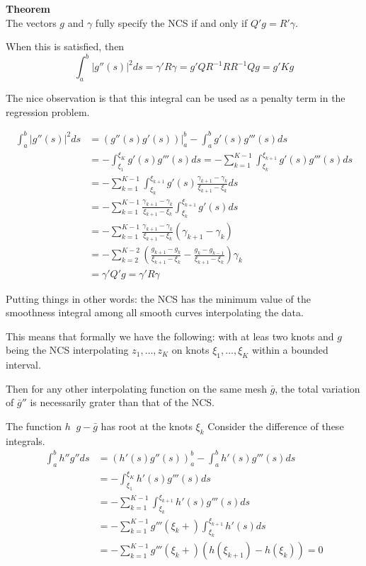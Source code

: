 \documentclass[a4paper]{article}
\newcommand{\clo}[1]{{\left [ #1 \right ]}}
\newcommand{\brac}[1]{{\left ( #1 \right )}}
\newcommand{\induc}[1]{{\left . #1 \right \vert}}
\newcommand{\abs}[1]{{\left | #1 \right |}}
\newcommand{\defn}{\mathop{\overset{\Delta}{=}}\nolimits}
\begin{document}
\noindent\textbf{Theorem}\hfill \\
The vectors $g$ and $\gamma$ fully specify the NCS if and only if $Q'g = R'\gamma$.

When this is satisfied, then 
\[\int_a^b \abs{g''(s)}^2 ds = \gamma' R \gamma = g' Q R^{-1} R R^{-1} Q g = g' K g\]

The nice observation is that this integral can be used as a penalty term in the regression problem.

\begin{align*}
	\int_a^b \abs{g''(s)}^2 ds &= \induc{\brac{g''(s)g'(s)}}_a^b - \int_a^b g'(s) g'''(s) ds \\
	&= - \int_{\xi_1}^{\xi_K} g'(s) g'''(s) ds = - \sum_{k=1}^{K-1} \int_{\xi_k}^{\xi_{k+1}} g'(s) g'''(s) ds\\
	&= - \sum_{k=1}^{K-1} \int_{\xi_k}^{\xi_{k+1}} g'(s) \frac{\gamma_{k+1}-\gamma_k}{\xi_{k+1}-\xi_k} ds\\
	&= - \sum_{k=1}^{K-1} \frac{\gamma_{k+1}-\gamma_k}{\xi_{k+1}-\xi_k} \int_{\xi_k}^{\xi_{k+1}} g'(s) ds\\
	&= - \sum_{k=1}^{K-1} \frac{\gamma_{k+1}-\gamma_k}{\xi_{k+1}-\xi_k} \brac{\gamma_{k+1}-\gamma_k}\\
	&= - \sum_{k=2}^{K-2} \brac{\frac{g_{k+1}-g_k}{\xi_{k+1}-\xi_k} - \frac{g_k-g_{k-1}}{\xi_{k+1}-\xi_k}} \gamma_k \\
	& = \gamma' Q' g = \gamma' R \gamma
\end{align*}

Putting things in other words:
the NCS has the minimum value of the smoothness integral among all smooth curves interpolating the data.

This means that formally we have the following:
with at leas two knots and $g$ being the NCS interpolating $z_1,\ldots,z_K$ on knots $\xi_1,\ldots,\xi_K$ within a bounded interval.

Then for any other interpolating function on the same mesh $\bar{g}$, the total variation of $\bar{g}''$ is necessarily grater than that of the NCS.


The function $h \defn g - \bar{g}$ has root at the knots $\xi_k$
Consider the difference of these integrals. 
\begin{align*}
	\int_a^b h'' g'' ds
	& = \brac{h'(s)g''(s)}_a^b - \int_a^b h'(s) g'''(s) ds \\
	& = - \int_{\xi_1}^{\xi_K} h'(s) g'''(s) ds \\
	& = - \sum_{k=1}^{K-1} \int_{\xi_k}^{\xi_{k+1}} h'(s) g'''(s) ds \\
	& = - \sum_{k=1}^{K-1}  g'''(\xi_k+) \int_{\xi_k}^{\xi_{k+1}} h'(s) ds \\
	& = - \sum_{k=1}^{K-1}  g'''(\xi_k+) \brac{h(\xi_{k+1})-h(\xi_k)} = 0
\end{align*}
\end{document}
